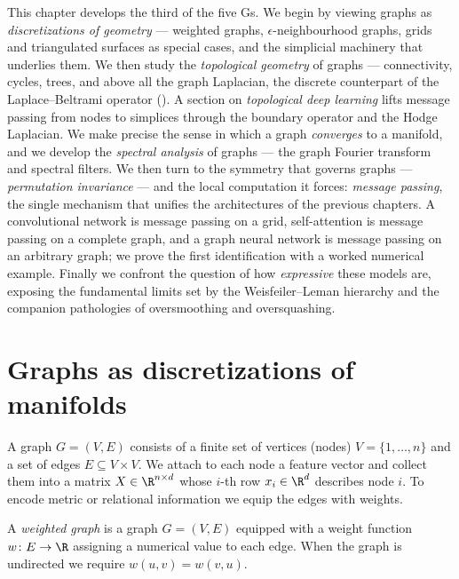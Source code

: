 This chapter develops the third of the five Gs. We begin by viewing graphs as
\emph{discretizations of geometry} --- weighted graphs, $\epsilon$-neighbourhood
graphs, grids and triangulated surfaces as special cases, and the simplicial
machinery that underlies them. We then study the \emph{topological geometry} of
graphs --- connectivity, cycles, trees, and above all the graph Laplacian, the
discrete counterpart of the Laplace--Beltrami operator (). A
section on \emph{topological deep learning} lifts message passing from nodes to
simplices through the boundary operator and the Hodge Laplacian. We make precise
the sense in which a graph \emph{converges} to a manifold, and we develop the
\emph{spectral analysis} of graphs --- the graph Fourier transform and spectral
filters. We then turn to the symmetry that governs graphs ---
\emph{permutation invariance} --- and the local computation it forces:
\emph{message passing}, the single mechanism that unifies the architectures of
the previous chapters. A convolutional network is message passing on a grid,
self-attention is message passing on a complete graph, and a graph neural
network is message passing on an arbitrary graph; we prove the first
identification with a worked numerical example. Finally we confront the question
of how \emph{expressive} these models are, exposing the fundamental limits set by
the Weisfeiler--Leman hierarchy and the companion pathologies of oversmoothing
and oversquashing.

\section{Graphs as discretizations of manifolds}
\label{sec:graphs:discretization}

A graph $G = (V, E)$ consists of a finite set of vertices (nodes)
$V = \{1, \dots, n\}$ and a set of edges $E \subseteq V \times V$. We attach to
each node a feature vector and collect them into a matrix
$X \in \R^{n \times d}$ whose $i$-th row $x_i \in \R^d$ describes node $i$. To
encode metric or relational information we equip the edges with weights.

\begin{definition}
\label{def:graphs:weighted}
A \emph{weighted graph} is a graph $G = (V, E)$ equipped with a weight function
$w \colon E \to \R$ assigning a numerical value to each edge. When the graph is
undirected we require $w(u,v) = w(v,u)$.
\end{definition}

